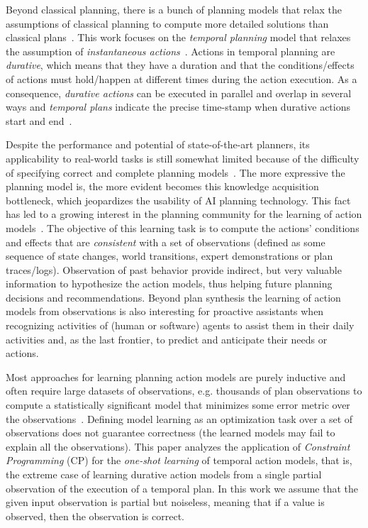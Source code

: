 \documentclass[runningheads]{llncs}
\begin{document}
Beyond classical planning, there is a bunch of planning models that relax the assumptions of classical planning to compute more detailed solutions than classical plans~\cite{ghallab2004automated}. This work focuses on the {\em temporal planning} model that relaxes the assumption of {\em instantaneous actions}~\cite{fox2003pddl2}. Actions in temporal planning are {\em durative}, which means that they have a duration and that the conditions/effects of actions must hold/happen at different times during the action execution. As a consequence, {\em durative actions} can be executed in parallel and overlap in several ways and {\em temporal plans} indicate the precise time-stamp when durative actions start and end~\cite{howey2004val,cushing2007temporal}.

Despite the performance and potential of state-of-the-art planners, its applicability to real-world tasks is still somewhat limited because of the difficulty of specifying correct and complete planning models~\cite{kambhampati2007model}. The more expressive the planning model is, the more evident becomes this knowledge acquisition bottleneck, which jeopardizes the usability of AI planning technology. This fact has led to a growing interest in the planning community for the learning of action models~\cite{jimenez2012review,arora2018review}. The objective of this learning task is to compute the actions' conditions and effects that are {\em consistent} with a set of observations (defined as some sequence of state changes, world transitions, expert demonstrations or plan traces/logs). Observation of past behavior provide indirect, but very valuable information to hypothesize the action models, thus helping future planning decisions and recommendations. Beyond plan synthesis the learning of action models from observations is also interesting for proactive assistants when recognizing activities of (human or software) agents to assist them in their daily activities and, as the last frontier, to predict and anticipate their needs or actions.

Most approaches for learning planning action models are purely inductive and often require large datasets of observations, e.g. thousands of plan observations to compute a statistically significant model that minimizes some error metric over the observations~\cite{kuvcera2018louga,MouraoZPS12,yang2007learning,zhuo2013action}. Defining model learning as an optimization task over a set of observations does not guarantee correctness (the learned models may fail to explain all the observations). This paper analyzes the application of {\em Constraint Programming} (CP) for the {\em one-shot learning} of temporal action models, that is, the extreme case of learning durative action models from a single partial observation of the execution of a temporal plan. In this work we assume that the given input observation is partial but noiseless, meaning that if a value is observed, then the observation is correct.
\end{document}
